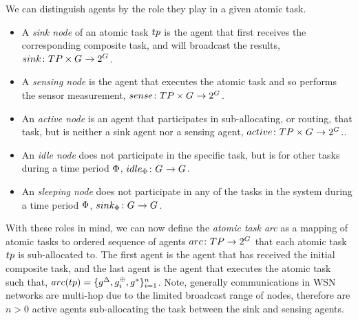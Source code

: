 We can distinguish agents by the role they play in a given atomic task.
\begin{itemize}
	\item A \textit{sink node} of an atomic task $\varAtomicTask{}{}$ is the agent that first receives the corresponding composite task, and will broadcast the results, $\formalSinkRole{}{}$.
	\item A \textit{sensing node} is the agent that executes the atomic task and so performs the sensor measurement, $\formalSenseRole{}{}$.
	\item An \textit{active node} is an agent that participates in sub-allocating, or routing, that task, but is neither a sink agent nor a sensing agent, $\formalActiveRole{}{}$..
	\item An \textit{idle node} does not participate in the specific task, but is for other tasks during a time period $\Phi$, $\formalIdleRole{}{}$.
	\item An \textit{sleeping node} does not participate in any of the tasks in the system during a time period $\Phi$, $\formalSleepRole{}{}$.
\end{itemize}
With these roles in mind, we can now define the  \textit{atomic task arc} as a mapping of atomic tasks to ordered sequence of agents $\formalTaskArc{}{}$ that each atomic task $\varAtomicTask{}{}$ is sub-allocated to. The first agent is the agent that has received the initial composite task, and the last agent is the agent that executes the atomic task such that, 
$\functionTaskArc{}{} = \lbrace \varSinkAgent{}{}, \varActiveAgent{i}{}, \varSensingAgent{}{} \rbrace_{i=1}^{n}$. Note, generally communications in WSN networks are multi-hop due to the limited broadcast range of nodes, therefore are $n>0$ active agents sub-allocating the task between the sink and sensing agents.

